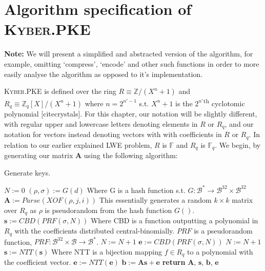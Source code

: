 \documentclass[a4paper, 10pt]{article}
\theoremstyle{definition}
\begin{document}
\section{Algorithm specification of \textsc{Kyber}.\ac{PKE}}

\textbf{Note:} We will present a simplified and abstracted version of the algorithm, for example, omitting `compress', `encode' and other such functions in order to more easily analyse the algorithm as opposed to it's implementation.

\textsc{Kyber}.\ac{PKE} is defined over the ring $R \equiv \mathbb{Z} /(X^n+1)$ and $R_q\equiv \mathbb{Z}_q[X]/(X^n+1)$ where $n=2^{n'-1}$ s.t. $X^{n}+1$ is the $2^{n'}$\textsuperscript{th} cyclotomic polynomial [citecrystals]. For this chapter, our notation will be slightly different, with regular upper and lowercase letters denoting elements in $R$ or $R_q$, and our notation for vectors instead denoting vectors with with coefficients in $R$ or $R_q$. In relation to our earlier explained \ac{LWE} problem, $R$ is $\mathbb{F}$ and $R_q$ is $\mathbb{F}_q$. We begin, by generating our matrix $\mathbf{A}$ using the following algorithm:
\begin{algorithm}[H]
    \caption{Generate keys.}
    \begin{algorithmic}[1]
    \State $N:=0$
    \State $(\rho, \sigma ):=G(d)$ \Comment Where G is a hash function s.t. $G:\mathcal{B}^* \rightarrow \mathcal{B}^{32}\times  \mathcal{B}^{32}$
            \State $\mathbf{A}:=Parse(XOF(\rho , j, i))$ \Comment This essentially generates a random $k\times k$ matrix over $R_q$ as $\rho$ is pseudorandom from the hash function $G()$.
        \EndFor
    \EndFor
        \State $\mathbf{s}:=CBD(PRF(\sigma ,N))$ \Comment Where CBD is a function outputting a polynomial in $R_q$ with the coefficients distributed central-binomially. $PRF$ is a pseudorandom function, $PRF:\mathcal{B}^{32} \times \mathcal{B} \rightarrow \mathcal{B}^*$.
        \State $N:=N+1$
    \EndFor
        \State $\mathbf{e}:=CBD(PRF(\sigma ,N))$
        \State $N:=N+1$
    \EndFor
    \State $\mathbf{s}:= NTT(\mathbf{s})$ \Comment Where \ac{NTT} is a bijection mapping $f \in R_q$ to a polynomial with the coefficient vector.
    \State $\mathbf{e}:= NTT(\mathbf{e})$
    \State $\mathbf{b}:=\mathbf{As}+\mathbf{e}$
    \State \textbf{return} $\mathbf{A}$, $\mathbf{s}$, $\mathbf{b}$, $\mathbf{e}$
    \end{algorithmic}
\end{algorithm}
\end{document}
